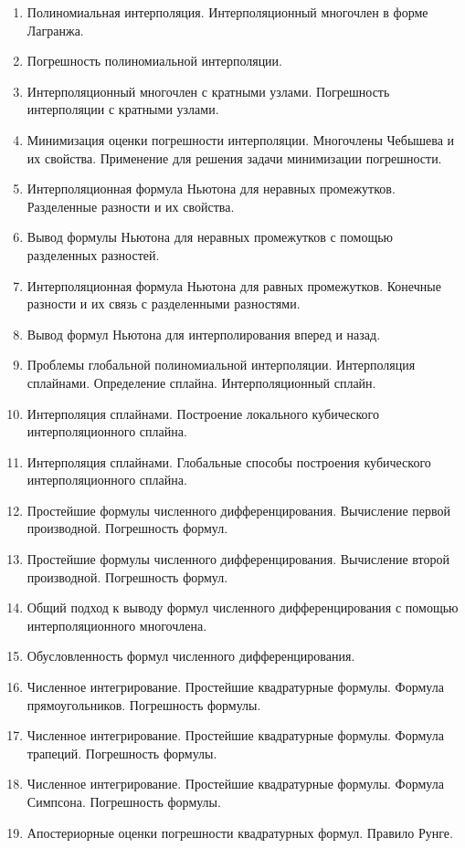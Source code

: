 \documentclass[14pt]{extarticle}
\begin{document}
\begin{enumerate}
    \item Полиномиальная интерполяция. Интерполяционный многочлен в форме Лагранжа. 
    \item Погрешность полиномиальной интерполяции. 
    \item Интерполяционный многочлен с кратными узлами. Погрешность интерполяции с кратными узлами. 
    \item Минимизация оценки погрешности интерполяции. Многочлены Чебышева и их свойства. Применение для решения задачи минимизации погрешности. 
    \item Интерполяционная формула Ньютона для неравных промежутков. Разделенные разности и их свойства. 
    \item Вывод формулы Ньютона для неравных промежутков с помощью разделенных разностей.  
    \item Интерполяционная формула Ньютона для равных промежутков. Конечные разности и их связь с разделенными разностями. 
    \item Вывод формул Ньютона для интерполирования вперед и назад. 
    \item Проблемы глобальной полиномиальной интерполяции. Интерполяция сплайнами. Определение сплайна. Интерполяционный сплайн. 
    \item Интерполяция сплайнами. Построение локального кубического интерполяционного сплайна. 
    \item Интерполяция сплайнами. Глобальные способы построения кубического интерполяционного сплайна. 
    \item Простейшие формулы численного дифференцирования. Вычисление первой производной. Погрешность формул. 
    \item Простейшие формулы численного дифференцирования. Вычисление второй производной. Погрешность формул. 
    \item Общий подход к выводу формул численного дифференцирования с помощью интерполяционного многочлена. 
    \item Обусловленность формул численного дифференцирования. 
    \item Численное интегрирование. Простейшие квадратурные формулы. Формула прямоугольников. Погрешность формулы. 
    \item Численное интегрирование. Простейшие квадратурные формулы. Формула трапеций. Погрешность формулы. 
    \item Численное интегрирование. Простейшие квадратурные формулы. Формула Симпсона. Погрешность формулы. 
    \item Апостериорные оценки погрешности квадратурных формул. Правило Рунге.
\end{enumerate}
\end{document}
